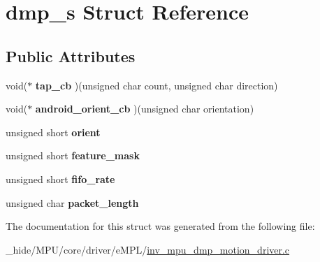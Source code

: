 \hypertarget{structdmp__s}{}\section{dmp\+\_\+s Struct Reference}
\label{structdmp__s}
\subsection*{Public Attributes}
\begin{DoxyCompactItemize}
\item 
\hypertarget{structdmp__s_af3acbe90fd87e158bb93137a830319ba}{}void($\ast$ {\bfseries tap\+\_\+cb} )(unsigned char count, unsigned char direction)\label{structdmp__s_af3acbe90fd87e158bb93137a830319ba}

\item 
\hypertarget{structdmp__s_ad0ff81aabe90ff753a3c94757d73ef76}{}void($\ast$ {\bfseries android\+\_\+orient\+\_\+cb} )(unsigned char orientation)\label{structdmp__s_ad0ff81aabe90ff753a3c94757d73ef76}

\item 
\hypertarget{structdmp__s_a191a6e89e9f575bc030a0cac5613b6a8}{}unsigned short {\bfseries orient}\label{structdmp__s_a191a6e89e9f575bc030a0cac5613b6a8}

\item 
\hypertarget{structdmp__s_a302548ec958df24e63eb21f268772a60}{}unsigned short {\bfseries feature\+\_\+mask}\label{structdmp__s_a302548ec958df24e63eb21f268772a60}

\item 
\hypertarget{structdmp__s_af3324bce8756b2cbf3cb0abcf022488c}{}unsigned short {\bfseries fifo\+\_\+rate}\label{structdmp__s_af3324bce8756b2cbf3cb0abcf022488c}

\item 
\hypertarget{structdmp__s_aa62a501c4d9335b7685c0ca96ab02c95}{}unsigned char {\bfseries packet\+\_\+length}\label{structdmp__s_aa62a501c4d9335b7685c0ca96ab02c95}

\end{DoxyCompactItemize}


The documentation for this struct was generated from the following file\+:\begin{DoxyCompactItemize}
\item 
\+\_\+hide/\+M\+P\+U/core/driver/e\+M\+P\+L/\hyperlink{inv__mpu__dmp__motion__driver_8c}{inv\+\_\+mpu\+\_\+dmp\+\_\+motion\+\_\+driver.\+c}\end{DoxyCompactItemize}
